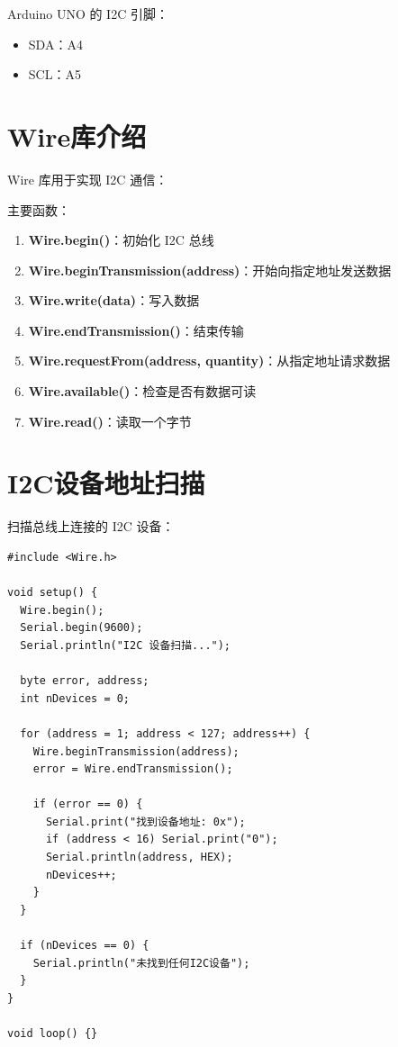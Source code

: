 \documentclass[12pt,UTF8]{ctexbook}
\begin{document}
Arduino UNO 的 I2C 引脚：
\begin{itemize}
    \item SDA：A4
    \item SCL：A5
\end{itemize}

\section{Wire库介绍}

Wire 库用于实现 I2C 通信：

主要函数：
\begin{enumerate}
    \item \textbf{Wire.begin()}：初始化 I2C 总线
    \item \textbf{Wire.beginTransmission(address)}：开始向指定地址发送数据
    \item \textbf{Wire.write(data)}：写入数据
    \item \textbf{Wire.endTransmission()}：结束传输
    \item \textbf{Wire.requestFrom(address, quantity)}：从指定地址请求数据
    \item \textbf{Wire.available()}：检查是否有数据可读
    \item \textbf{Wire.read()}：读取一个字节
\end{enumerate}

\section{I2C设备地址扫描}

扫描总线上连接的 I2C 设备：

\begin{lstlisting}
#include <Wire.h>

void setup() {
  Wire.begin();
  Serial.begin(9600);
  Serial.println("I2C 设备扫描...");
  
  byte error, address;
  int nDevices = 0;
  
  for (address = 1; address < 127; address++) {
    Wire.beginTransmission(address);
    error = Wire.endTransmission();
    
    if (error == 0) {
      Serial.print("找到设备地址: 0x");
      if (address < 16) Serial.print("0");
      Serial.println(address, HEX);
      nDevices++;
    }
  }
  
  if (nDevices == 0) {
    Serial.println("未找到任何I2C设备");
  }
}

void loop() {}
\end{lstlisting}
\end{document}
